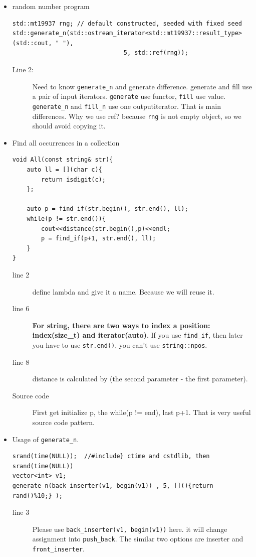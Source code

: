 \documentclass[a4paper,11pt,twoside]{book}
\begin{document}
\begin{itemize}
\item random number program
\begin{lstlisting}[numbers=none]
std::mt19937 rng; // default constructed, seeded with fixed seed
std::generate_n(std::ostream_iterator<std::mt19937::result_type>(std::cout, " "),
                               5, std::ref(rng));
\end{lstlisting}
\begin{description}
	\item[Line 2:] Need to know \texttt{generate\_n} and generate difference. generate and fill use a pair of input iterators. \texttt{generate} use functor, \texttt{fill} use value. \texttt{generate\_n} and \texttt{fill\_n} use one outputiterator. That is main differences. Why we use ref? because \texttt{rng} is not empty object, so we should avoid copying it. 
\end{description}

\item Find all occurrences in a collection
\begin{lstlisting}[numbers=none]
void All(const string& str){
	auto ll = [](char c){
		return isdigit(c);
	};
	
	auto p = find_if(str.begin(), str.end(), ll);
	while(p != str.end()){
		cout<<distance(str.begin(),p)<<endl;
		p = find_if(p+1, str.end(), ll);
	}
}	
\end{lstlisting}
\begin{description}
	\item[line 2] define lambda and give it a name. Because we will reuse it.
	\item[line 6] \textbf{For string, there are two ways to index a position: index(size\_t) and iterator(auto)}. If you use \texttt{find\_if}, then later you have to use \texttt{str.end()}, you can't use \texttt{string::npos}.
	\item[line 8] distance is calculated by (the second parameter - the first parameter).
	\item[Source code] First get initialize p, the while(p != end), last p+1. That is very useful source code pattern. 
\end{description}

\item Usage of \texttt{generate\_n}.
\begin{lstlisting}[numbers=none]
srand(time(NULL));  //#include} ctime and cstdlib, then srand(time(NULL))
vector<int> v1;
generate_n(back_inserter(v1, begin(v1)) , 5, [](){return rand()%10;} );			
\end{lstlisting}
	\begin{description}
		\item[line 3] Please use \texttt{back\_inserter(v1, begin(v1))} here. it will change assignment into \texttt{push\_back}. The similar two options are inserter and \texttt{front\_inserter}. 		
	\end{description}
	

\end{itemize}
\end{document}

